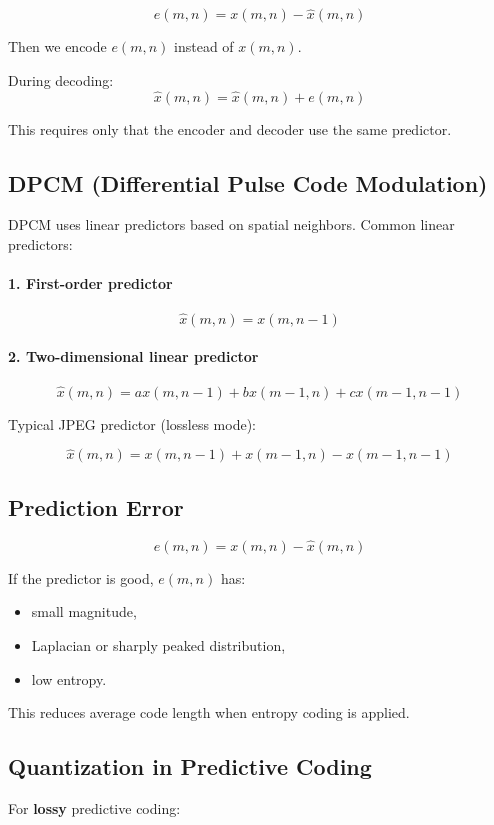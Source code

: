 \documentclass{AnantDocumentation}
\begin{document}
\[
e(m,n) = x(m,n) - \hat{x}(m,n)
\]

Then we encode $e(m,n)$ instead of $x(m,n)$.

During decoding:
\[
\hat{x}(m,n) = \hat{x}(m,n) + e(m,n)
\]

This requires only that the encoder and decoder use the same predictor.

\subsection{DPCM (Differential Pulse Code Modulation)}

DPCM uses linear predictors based on spatial neighbors. Common linear predictors:

\paragraph{1. First-order predictor}
\[
\hat{x}(m,n) = x(m,n-1)
\]

\paragraph{2. Two-dimensional linear predictor}
\[
\hat{x}(m,n) = ax(m,n-1) + bx(m-1,n) + cx(m-1,n-1)
\]

Typical JPEG predictor (lossless mode):

\[
\hat{x}(m,n) = x(m,n-1) + x(m-1,n) - x(m-1,n-1)
\]

\subsection{Prediction Error}

\[
e(m,n) = x(m,n) - \hat{x}(m,n)
\]

If the predictor is good, $e(m,n)$ has:
\begin{itemize}
\item small magnitude,
\item Laplacian or sharply peaked distribution,
\item low entropy.
\end{itemize}

This reduces average code length when entropy coding is applied.

\subsection{Quantization in Predictive Coding}

For \textbf{lossy} predictive coding:
\end{document}
